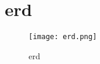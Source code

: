 \section{\Acrfull{erd}}\label{appendix:erd}
\begin{figure}[hbt!]
  \centering
  \texttt{[image: erd.png]}
  \caption{\Acrfull{erd}}
  \label{fig:erd}
\end{figure}

\newpage